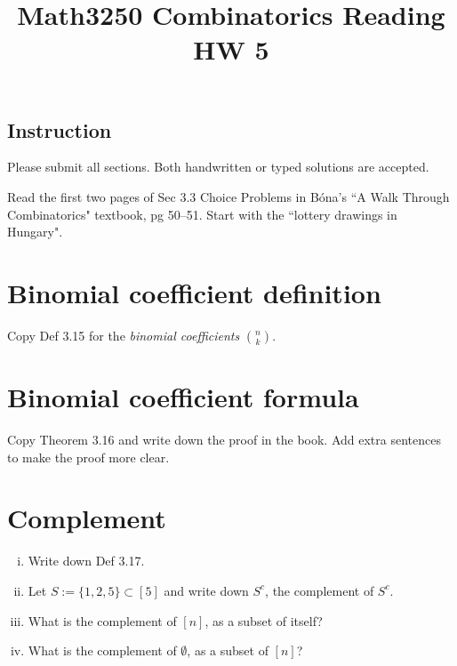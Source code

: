 \documentclass[12pt]{amsart}
\title{Math3250 Combinatorics Reading HW 5}
\begin{document}
\maketitle



\subsection*{Instruction}
Please submit all sections. Both handwritten or typed solutions are accepted.


Read the first two pages of Sec 3.3 Choice Problems in B\'ona's ``A Walk Through Combinatorics" textbook, pg 50--51. Start with the ``lottery drawings in Hungary".

\bigskip


\section{Binomial coefficient definition}
Copy Def 3.15 for the \emph{binomial coefficients} $\binom{n}{k}$.



\section{Binomial coefficient formula}
Copy Theorem 3.16 and write down the proof in the book. Add extra sentences to make the proof more clear.


\section{Complement}
\begin{enumerate}[i.]
\item 
Write down Def 3.17.
\item 
Let $S:= \{1,2,5 \} \subset [5]$ and write down $S^c$, the complement of $S^c$.

\item 
What is the complement of $[n]$, as a subset of itself?

\item 
What is the complement of $\emptyset$, as a subset of $[n]$?

\end{enumerate}
\end{document}
